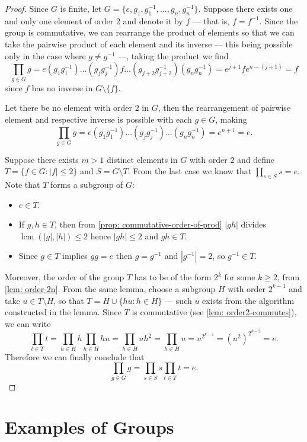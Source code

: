 \begin{proof}
Since \(G\) is finite, let \(G = \{e, g_1, g_1^{-1}, \dots, g_n, g_n^{-1}\}\).
Suppose there exists one and only one element of order \(2\) and denote it by
\(f\) --- that is, \(f = f^{-1}\). Since the group is commutative, we can
rearrange the product of elements so that we can take the pairwise product of
each element and its inverse --- this being possible only in the case where
\(g \neq g^{-1}\) ---, taking the product we find
\[
  \prod_{g \in G} g = e (g_1 g_1^{-1}) \dots (g_j g_j^{-1}) f \dots (g_{j + 2}
  g_{j + 2}^{-1}) (g_n g_n^{-1}) = e^{j + 1} f e^{n - (j + 1)} = f
\]
since \(f\) has no inverse in \(G \setminus \{f\}\).

Let there be no element with order \(2\) in \(G\), then the rearrangement of
pairwise element and respective inverse is possible with each \(g \in G\),
making
\[
  \prod_{g \in G} g = e (g_1 g_1^{-1}) \dots (g_j g_j^{-1}) \dots (g_n
  g_n^{-1}) = e^{n + 1} = e.
\]

Suppose there exists \(m > 1\) distinct elements in \(G\) with order \(2\) and
define \(T = \{f \in G: |f| \leq 2\}\) and \(S = G \setminus T\). From the
last case we know that \(\prod_{s \in S} s = e\). Note that \(T\) forms a
subgroup of \(G\):
\begin{itemize}
  \item \(e \in T\).
  \item If \(g, h \in T\), then from \cref{prop: commutative-order-of-prod}
    \(|gh|\) divides \(\operatorname{lcm}(|g|, |h|) \leq 2\) hence \(|gh| \leq
    2\) and \(gh \in T\).
  \item Since \(g \in T\) implies \(g g = e\) then \(g = g^{-1}\) and
    \(|g^{-1}| = 2\), so \(g^{-1} \in T\).
\end{itemize}
Moreover, the order of the group \(T\) has to be of the form \(2^k\) for some
\(k \geq 2\), from \cref{lem: order-2n}. From the same lemma, choose a
subgroup \(H\) with order \(2^{k-1}\) and take \(u \in T \setminus H\), so
that \(T = H \cup \{hu: h \in H\}\) --- such \(u\) exists from the algorithm
constructed in the lemma. Since \(T\) is commutative (see \cref{lem:
order2-commutes}), we can write
\[
  \prod_{t \in T} t = \prod_{h \in H} h \prod_{h \in H} hu = \prod_{h \in H} u
  h^2 = \prod_{h \in H} u = u^{2^{k-1}} = (u^2)^{2^{k-2}} = e.
\]
Therefore we can finally conclude that
\[
  \prod_{g \in G} g = \prod_{s \in S} s \prod_{t \in T} t = e.
\]
\end{proof}

\section{Examples of Groups}

